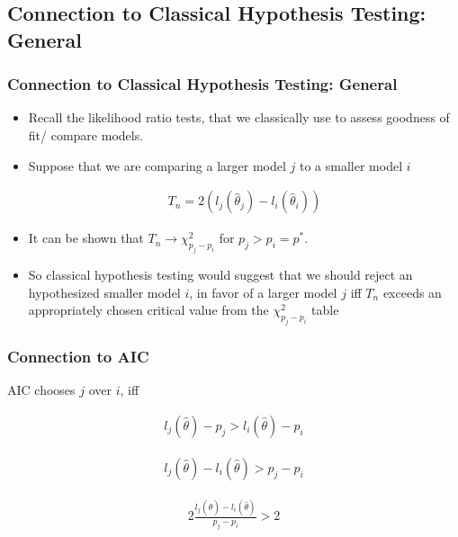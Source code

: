 \documentclass[
  shownotes,
  xcolor={svgnames},
  hyperref={colorlinks,citecolor=DarkBlue,linkcolor=DarkRed,urlcolor=DarkBlue}
  , aspectratio=169]{beamer}
\begin{document}
\subsection{Connection to Classical Hypothesis Testing: General}
\begin{frame}[fragile]
\frametitle{Connection to Classical Hypothesis Testing: General}
\begin{itemize}
  \item Recall the likelihood ratio tests, that we classically use to assess goodness of fit/ compare models.
  \medskip
  \item Suppose that we are comparing a larger model $j$ to a smaller model $i$
   

   \begin{align}
   T_n=2(l_j(\hat \theta_j)-l_i(\hat \theta_i)) 
   \end{align}
   
  \item It can be shown that $T_n \rightarrow \chi^2_{p_j-p_i}$ for $p_j >p_i=p^*$. 
  \medskip
  \item  So classical hypothesis testing would suggest that we should reject an hypothesized smaller model $i$, in favor of a larger model $j$ iff $T_n$ exceeds an appropriately chosen critical value from the $\chi^2_{p_j-p_i}$ table
\end{itemize}
\end{frame}

\begin{frame}[fragile]
\frametitle{Connection to AIC}

AIC chooses $j$ over $i$, iff 

\begin{align}
l_j(\hat \theta) - p_j > l_i(\hat \theta) - p_i
\end{align}

\begin{align}
l_j(\hat \theta) - l_i(\hat \theta) > p_j - p_i
\end{align}

\begin{align}
2\frac{l_j(\hat \theta) - l_i(\hat \theta)}{p_j - p_i} > 2
\end{align}

\end{frame}
\end{document}
